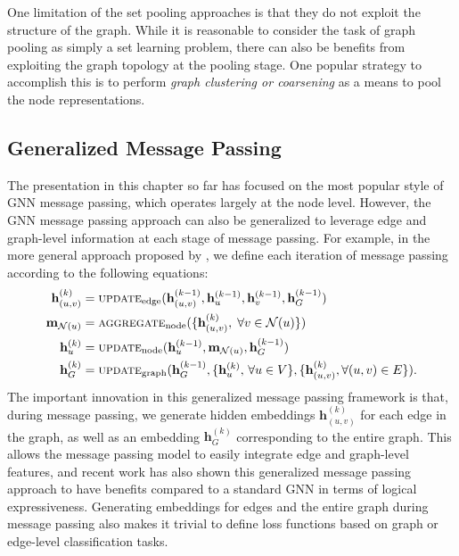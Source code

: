 \documentclass[10pt]{book}
\begin{document}
One limitation of the set pooling approaches is that they do not exploit the structure of the graph. While it is reasonable to consider the task of graph pooling as simply a set learning problem, there can also be benefits from exploiting the graph topology at the pooling stage. One popular strategy to accomplish this is to perform \emph{graph clustering or coarsening} as a means to pool the node representations.

\subsection{Generalized Message Passing}

The presentation in this chapter so far has focused on the most popular style of GNN message passing, which operates largely at the node level. However, the GNN message passing approach can also be generalized to leverage edge and graph-level information at each stage of message passing. For example, in the more general approach proposed by \cite{battaglia2018relational}, we define each iteration of message passing according to the following equations:
\begin{align}
    \mathbf h^{(k)}_{(u,v)} &= \textsc{update}_\text{edge} (\mathbf h_{(u,v)}^{(k-1)}, \mathbf h_u^{(k-1)}, \mathbf h_v^{(k-1)}, \mathbf h_G^{(k-1)})
    \label{eq:upedge} \\
    \mathbf m_{\mathcal N(u)} &= \textsc{aggregate}_\text{node}(\{ \mathbf h_{(u,v)}^{(k)}, \; \forall v \in \mathcal N(u) \})
    \label{eq:message} \\
    \mathbf h^{(k)}_u &= \textsc{update}_\text{node} ( \mathbf h_u^{(k-1)}, \mathbf m_{\mathcal N(u)}, \mathbf h_G^{(k-1)})
    \label{eq:upnode} \\
    \mathbf h^{(k)}_G &= \textsc{update}_\text{graph}(\mathbf h_G^{( k-1)}, \{ \mathbf h_u^{(k)}, \, \forall u \in V\}, \{ \mathbf h_{(u,v)}^{(k)}, \forall (u, v) \in E\}).
    \label{eq:upgraph}
\end{align}
The important innovation in this generalized message passing framework is that, during message passing, we generate hidden embeddings $\mathbf h_{(u,v)}^{(k)}$ for each edge in the graph, as well as an embedding $\mathbf h_G^{(k)}$ corresponding to the entire graph. This allows the message passing model to easily integrate edge and graph-level features, and recent work has also shown this generalized message passing approach to have benefits compared to a standard GNN in terms of logical expressiveness. Generating embeddings for edges and the entire graph during message passing also makes it trivial to define loss functions based on graph or edge-level classification tasks.
\end{document}
